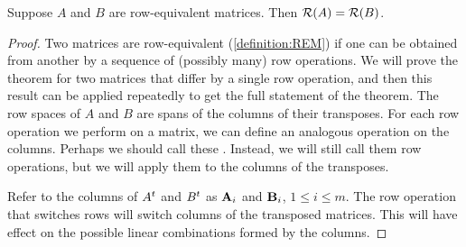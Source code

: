 \documentclass{ximera}
\begin{document}
\begin{theorem}
  \label{theorem:REMRS}Suppose $A$ and $B$ are row-equivalent
  matrices.  Then $\mathcal{R}\!\left(A\right)=\mathcal{R}\!\left(B\right)$.

  \begin{proof}
    Two matrices are row-equivalent (\ref{definition:REM}) if one can
    be obtained from another by a sequence of (possibly many) row
    operations.  We will prove the theorem for two matrices that
    differ by a single row operation, and then this result can be
    applied repeatedly to get the full statement of the theorem.  The
    row spaces of $A$ and $B$ are spans of the columns of their
    transposes.  For each row operation we perform on a matrix, we can
    define an analogous operation on the columns.  Perhaps we should
    call these .  Instead, we will still call
    them row operations, but we will apply them to the columns of the
    transposes.

    Refer to the columns of $A^{t}$ and $B^{t}$ as
    $\mathbf{A}_i$ and $\mathbf{B}_i$, $1\leq i\leq m$.  The row operation
    that switches rows will switch columns of the transposed matrices.
    This will have  effect
    on the possible linear combinations formed by the columns.


\end{proof}
\end{theorem}
\end{document}

